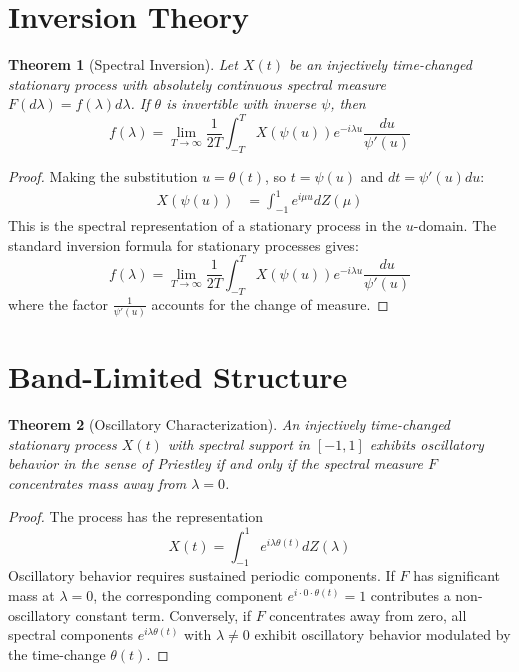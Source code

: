 \documentclass[11pt]{article}
\newtheorem{theorem}{Theorem}
\begin{document}
\section{Inversion Theory}

\begin{theorem}[Spectral Inversion]
Let $X(t)$ be an injectively time-changed stationary process with absolutely continuous spectral measure $F(d\lambda) = f(\lambda)d\lambda$. If $\theta$ is invertible with inverse $\psi$, then
\begin{equation}
f(\lambda) = \lim_{T \to \infty} \frac{1}{2T} \int_{-T}^T X(\psi(u)) e^{-i\lambda u} \frac{du}{\psi'(u)}
\end{equation}
\end{theorem}

\begin{proof}
Making the substitution $u = \theta(t)$, so $t = \psi(u)$ and $dt = \psi'(u)du$:
\begin{align}
X(\psi(u)) &= \int_{-1}^1 e^{i\mu u} dZ(\mu)
\end{align}
This is the spectral representation of a stationary process in the $u$-domain. The standard inversion formula for stationary processes gives:
\begin{equation}
f(\lambda) = \lim_{T \to \infty} \frac{1}{2T} \int_{-T}^T X(\psi(u)) e^{-i\lambda u} \frac{du}{\psi'(u)}
\end{equation}
where the factor $\frac{1}{\psi'(u)}$ accounts for the change of measure.
\end{proof}

\section{Band-Limited Structure}

\begin{theorem}[Oscillatory Characterization]
An injectively time-changed stationary process $X(t)$ with spectral support in $[-1,1]$ exhibits oscillatory behavior in the sense of Priestley if and only if the spectral measure $F$ concentrates mass away from $\lambda = 0$.
\end{theorem}

\begin{proof}
The process has the representation
\begin{equation}
X(t) = \int_{-1}^1 e^{i\lambda\theta(t)} dZ(\lambda)
\end{equation}
Oscillatory behavior requires sustained periodic components. If $F$ has significant mass at $\lambda = 0$, the corresponding component $e^{i \cdot 0 \cdot \theta(t)} = 1$ contributes a non-oscillatory constant term. Conversely, if $F$ concentrates away from zero, all spectral components $e^{i\lambda\theta(t)}$ with $\lambda \neq 0$ exhibit oscillatory behavior modulated by the time-change $\theta(t)$.
\end{proof}
\end{document}
